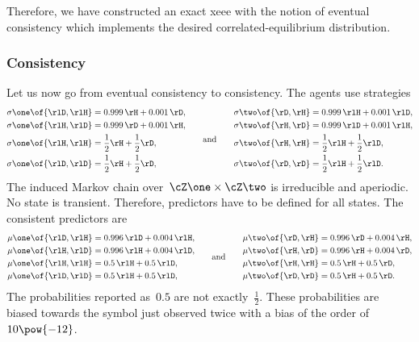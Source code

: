 Therefore, we have constructed an exact \ac{xeee} with the notion of eventual consistency which implements the desired correlated-equilibrium distribution.

\subsubsection{Consistency}

Let us now go from eventual consistency to consistency.
The agents use strategies
\[
\begin{aligned}
\sigma\one \of{\rlD, \rlH} & = 0.999 \, \rH + 0.001 \, \rD, \\
\sigma\one \of{\rlH, \rlD} & = 0.999 \, \rD + 0.001 \, \rH, \\
\sigma\one \of{\rlH, \rlH} & = \frac{1}{2} \rH + \frac{1}{2} \rD, \\
\sigma\one \of{\rlD, \rlD} & = \frac{1}{2} \rH + \frac{1}{2} \rD, \\
\end{aligned}
\qquad\text{and}\qquad
\begin{aligned}
\sigma\two \of{\rD, \rH} & = 0.999 \, \rlH + 0.001 \, \rlD, \\
\sigma\two \of{\rH, \rD} & = 0.999 \, \rlD + 0.001 \, \rlH, \\
\sigma\two \of{\rH, \rH} & = \frac{1}{2} \rlH + \frac{1}{2} \rlD, \\
\sigma\two \of{\rD, \rD} & = \frac{1}{2} \rlH + \frac{1}{2} \rlD. \\
\end{aligned}
\]
The induced Markov chain over~\(\cZ\one \times \cZ\two\) is irreducible and aperiodic.
No state is transient.
Therefore, predictors have to be defined for all states.
The consistent predictors are
\[
\begin{aligned}
\mu\one \of{\rlD, \rlH} & = 0.996 \, \rlD + 0.004 \, \rlH, \\
\mu\one \of{\rlH, \rlD} & = 0.996 \, \rlH + 0.004 \, \rlD, \\
\mu\one \of{\rlH, \rlH} & = 0.5 \, \rlH + 0.5 \, \rlD, \\
\mu\one \of{\rlD, \rlD} & = 0.5 \, \rlH + 0.5 \, \rlD, \\
\end{aligned}
\qquad\text{and}\qquad
\begin{aligned}
\mu\two \of{\rD, \rH} & = 0.996 \, \rD + 0.004 \, \rH, \\
\mu\two \of{\rH, \rD} & = 0.996 \, \rH + 0.004 \, \rD, \\
\mu\two \of{\rH, \rH} & = 0.5 \, \rH + 0.5 \, \rD, \\
\mu\two \of{\rD, \rD} & = 0.5 \, \rH + 0.5 \, \rD. \\
\end{aligned}
\]
The probabilities reported as~\(0.5\) are not exactly~\(\frac{1}{2}\).
These probabilities are biased towards the symbol just observed twice with a bias of the order of~\(10\pow{-12}\).

